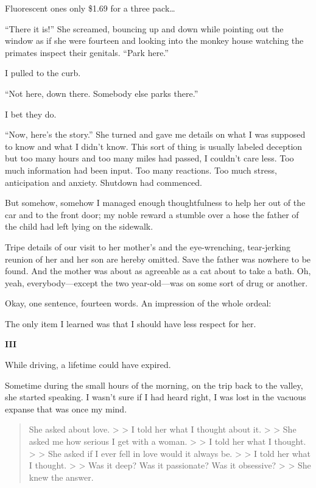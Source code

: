Fluorescent ones only \$1.69 for a three pack\ldots{}

``There it is!'' She screamed, bouncing up and down while pointing out
the window as if she were fourteen and looking into the monkey house
watching the primates inspect their genitals. ``Park here.''

I pulled to the curb.

``Not here, down there. Somebody else parks there.''

I bet they do.

``Now, here's the story.'' She turned and gave me details on what I was
supposed to know and what I didn't know. This sort of thing is usually
labeled deception but too many hours and too many miles had passed, I
couldn't care less. Too much information had been input. Too many
reactions. Too much stress, anticipation and anxiety. Shutdown had
commenced.

But somehow, somehow I managed enough thoughtfulness to help her out of
the car and to the front door; my noble reward a stumble over a hose the
father of the child had left lying on the sidewalk.

Tripe details of our visit to her mother's and the eye-wrenching,
tear-jerking reunion of her and her son are hereby omitted. Save the
father was nowhere to be found. And the mother was about as agreeable as
a cat about to take a bath. Oh, yeah, everybody---except the two
year-old---was on some sort of drug or another.

Okay, one sentence, fourteen words. An impression of the whole ordeal:

The only item I learned was that I should have less respect for her.

\textbf{III}

While driving, a lifetime could have expired.

Sometime during the small hours of the morning, on the trip back to the
valley, she started speaking. I wasn't sure if I had heard right, I was
lost in the vacuous expanse that was once my mind.

\begin{quote}
She asked about love. \textgreater{} \textgreater{} I told her what I
thought about it. \textgreater{} \textgreater{} She asked me how serious
I get with a woman. \textgreater{} \textgreater{} I told her what I
thought. \textgreater{} \textgreater{} She asked if I ever fell in love
would it always be. \textgreater{} \textgreater{} I told her what I
thought. \textgreater{} \textgreater{} Was it deep? Was it passionate?
Was it obsessive? \textgreater{} \textgreater{} She knew the answer.
\end{quote}

